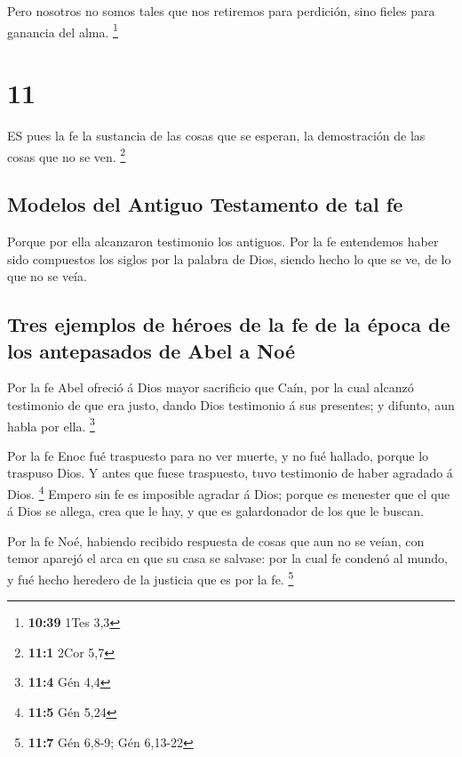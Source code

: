  Pero nosotros no somos tales que nos retiremos para
perdición, sino fieles para ganancia del alma. \footnote{\textbf{10:39}
  1Tes 3,3}

\hypertarget{section-10}{%
\section{11}\label{section-10}}

 ES pues la fe la sustancia de las cosas que se esperan, la
demostración de las cosas que no se ven. \footnote{\textbf{11:1} 2Cor
  5,7}

\hypertarget{modelos-del-antiguo-testamento-de-tal-fe}{%
\subsection{Modelos del Antiguo Testamento de tal
fe}\label{modelos-del-antiguo-testamento-de-tal-fe}}

 Porque por ella alcanzaron testimonio los antiguos.
 Por la fe entendemos haber sido compuestos los siglos por
la palabra de Dios, siendo hecho lo que se ve, de lo que no se veía.

\hypertarget{tres-ejemplos-de-huxe9roes-de-la-fe-de-la-uxe9poca-de-los-antepasados-de-abel-a-nouxe9}{%
\subsection{Tres ejemplos de héroes de la fe de la época de los
antepasados \hspace{0pt}\hspace{0pt}de Abel a
Noé}\label{tres-ejemplos-de-huxe9roes-de-la-fe-de-la-uxe9poca-de-los-antepasados-de-abel-a-nouxe9}}

 Por la fe Abel ofreció á Dios mayor sacrificio que Caín,
por la cual alcanzó testimonio de que era justo, dando Dios testimonio á
sus presentes; y difunto, aun habla por ella. \footnote{\textbf{11:4}
  Gén 4,4}

 Por la fe Enoc fué traspuesto para no ver muerte, y no fué
hallado, porque lo traspuso Dios. Y antes que fuese traspuesto, tuvo
testimonio de haber agradado á Dios. \footnote{\textbf{11:5} Gén 5,24}
 Empero sin fe es imposible agradar á Dios; porque es
menester que el que á Dios se allega, crea que le hay, y que es
galardonador de los que le buscan.

 Por la fe Noé, habiendo recibido respuesta de cosas que aun
no se veían, con temor aparejó el arca en que su casa se salvase: por la
cual fe condenó al mundo, y fué hecho heredero de la justicia que es por
la fe. \footnote{\textbf{11:7} Gén 6,8-9; Gén 6,13-22}

